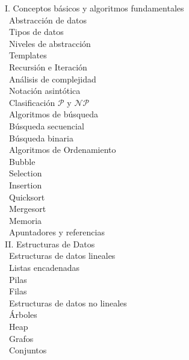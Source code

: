 \documentclass[12pt, letterpaper, oneside]{article}
\newcommand{\topic}{{\color{darkgreen}{\Rectangle}}}
\newcommand{\subtopic}{{\enskip \color{darkblue}{\Rectangle}}}
\begin{document}
  \begin{center} 
  \begin{minipage}{5in}
  \begin{flushleft}
  {\large I. Conceptos básicos y algoritmos fundamentales} \\[2ex]
  \topic ~Abstracción de datos \\
  \subtopic ~Tipos de datos \\
  \subtopic ~Niveles de abstracción \\
  \subtopic ~Templates \\
  \topic ~Recursión e Iteración \\
  \topic ~Análisis de complejidad \\
  \subtopic ~Notación asintótica \\
  \subtopic ~Clasificación $\mathcal{P}$ y $\mathcal{NP}$ \\
  \topic ~Algoritmos de búsqueda \\
  \subtopic ~Búsqueda secuencial \\
  \subtopic ~Búsqueda binaria \\
  \topic ~Algoritmos de Ordenamiento \\
  \subtopic ~Bubble \\
  \subtopic ~Selection \\
  \subtopic ~Insertion \\
  \subtopic ~Quicksort \\
  \subtopic ~Mergesort \\
  \topic ~Memoria \\
  \subtopic ~Apuntadores y referencias \\[2.5ex]
  {\large II. Estructuras de Datos} \\[2ex]
  \topic ~Estructuras de datos lineales \\
  \subtopic ~Listas encadenadas \\
  \subtopic ~Pilas \\
  \subtopic ~Filas \\
  \topic ~Estructuras de datos no lineales \\
  \subtopic ~Árboles \\
  \subtopic ~Heap \\
  \subtopic ~Grafos \\
  \subtopic ~Conjuntos

  \end{flushleft}
  \end{minipage}
  \end{center}
\end{document}
